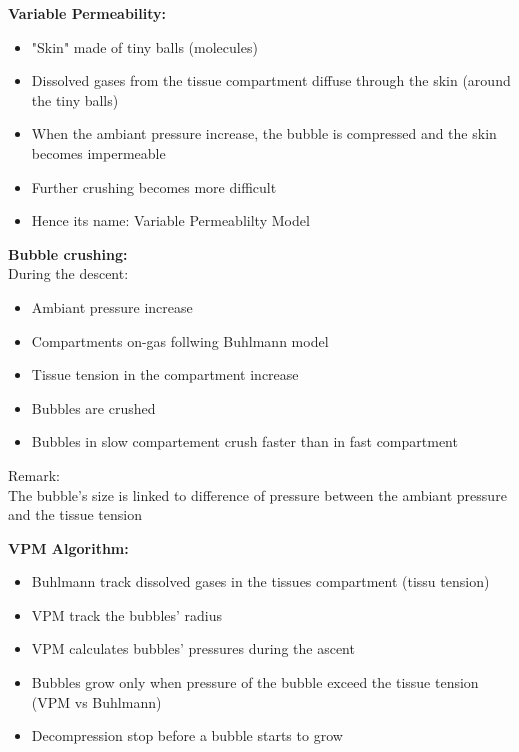 \documentclass[aspectratio=1610,english,14pt]{beamer}
\begin{document}
\begin{frame}{\insertsubsection}
	\textbf{Variable Permeability:}
	\begin{itemize}
		\item "Skin" made of tiny balls (molecules)
		\item Dissolved gases from the tissue compartment diffuse through the skin (around the tiny balls)
		\item When the ambiant pressure increase, the bubble is compressed and the skin becomes impermeable
		\item Further crushing becomes more difficult
		\item Hence its name: Variable Permeablilty Model
	\end{itemize}
\end{frame}

\begin{frame}{\insertsubsection}
	\textbf{Bubble crushing:}\\
	During the descent:
	\begin{itemize}
		\item Ambiant pressure increase
		\item Compartments on-gas follwing Buhlmann model
		\item Tissue tension in the compartment increase
		\item Bubbles are crushed
		\item Bubbles in slow compartement crush faster than in fast compartment 
	\end{itemize}
	\pause \vfill
	Remark:\\
	The bubble's size is linked to difference of pressure between the ambiant pressure and the tissue tension
\end{frame}

\begin{frame}{\insertsubsection}  
	\textbf{VPM Algorithm:}
	\begin{itemize}
		\item Buhlmann track dissolved gases in the tissues compartment (tissu tension)
		\item VPM track the bubbles' radius
		\item VPM calculates bubbles' pressures during the ascent
		\item Bubbles grow only when pressure of the bubble exceed the tissue tension (VPM vs Buhlmann)
		\item Decompression stop before a bubble starts to grow
	\end{itemize}
\end{frame}
\end{document}
